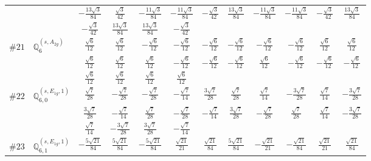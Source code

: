 \documentclass[fleqn,9pt,landscape]{jsarticle}
\begin{document}
\begin{center}
\begin{longtable}{lcccccccccc}
& $ - \frac{13 \sqrt{3}}{84} $ & $ \frac{\sqrt{3}}{42} $ & $ - \frac{11 \sqrt{3}}{84} $ & $ - \frac{11 \sqrt{3}}{84} $ & $ - \frac{\sqrt{3}}{42} $ & $ \frac{13 \sqrt{3}}{84} $ & $ - \frac{11 \sqrt{3}}{84} $ & $ - \frac{11 \sqrt{3}}{84} $ & $ - \frac{\sqrt{3}}{42} $ & $ \frac{13 \sqrt{3}}{84} $ \\
& $ - \frac{\sqrt{3}}{42} $ & $ \frac{13 \sqrt{3}}{84} $ & $ \frac{13 \sqrt{3}}{84} $ & $ - \frac{\sqrt{3}}{42} $ & $  $ & $  $ & $  $ & $  $ & $  $ & $  $ \\ \hline
$ \#21\quad \mathbb{Q}_{6}^{(s,A_{2g})} $ & $ \frac{\sqrt{6}}{12} $ & $ \frac{\sqrt{6}}{12} $ & $ - \frac{\sqrt{6}}{12} $ & $ - \frac{\sqrt{6}}{12} $ & $ - \frac{\sqrt{6}}{12} $ & $ - \frac{\sqrt{6}}{12} $ & $ - \frac{\sqrt{6}}{12} $ & $ - \frac{\sqrt{6}}{12} $ & $ \frac{\sqrt{6}}{12} $ & $ \frac{\sqrt{6}}{12} $ \\
& $ \frac{\sqrt{6}}{12} $ & $ \frac{\sqrt{6}}{12} $ & $ \frac{\sqrt{6}}{12} $ & $ - \frac{\sqrt{6}}{12} $ & $ - \frac{\sqrt{6}}{12} $ & $ - \frac{\sqrt{6}}{12} $ & $ \frac{\sqrt{6}}{12} $ & $ - \frac{\sqrt{6}}{12} $ & $ - \frac{\sqrt{6}}{12} $ & $ - \frac{\sqrt{6}}{12} $ \\
& $ \frac{\sqrt{6}}{12} $ & $ \frac{\sqrt{6}}{12} $ & $ \frac{\sqrt{6}}{12} $ & $ \frac{\sqrt{6}}{12} $ & $  $ & $  $ & $  $ & $  $ & $  $ & $  $ \\ \hline
$ \#22\quad \mathbb{Q}_{6,0}^{(s,E_{1g},1)} $ & $ \frac{\sqrt{7}}{28} $ & $ - \frac{\sqrt{7}}{28} $ & $ - \frac{\sqrt{7}}{28} $ & $ - \frac{\sqrt{7}}{14} $ & $ \frac{3 \sqrt{7}}{28} $ & $ \frac{\sqrt{7}}{28} $ & $ \frac{\sqrt{7}}{14} $ & $ - \frac{3 \sqrt{7}}{28} $ & $ \frac{\sqrt{7}}{14} $ & $ - \frac{3 \sqrt{7}}{28} $ \\
& $ \frac{3 \sqrt{7}}{28} $ & $ - \frac{\sqrt{7}}{14} $ & $ \frac{\sqrt{7}}{28} $ & $ - \frac{\sqrt{7}}{28} $ & $ - \frac{\sqrt{7}}{14} $ & $ \frac{3 \sqrt{7}}{28} $ & $ - \frac{\sqrt{7}}{28} $ & $ \frac{\sqrt{7}}{28} $ & $ \frac{\sqrt{7}}{14} $ & $ - \frac{3 \sqrt{7}}{28} $ \\
& $ \frac{\sqrt{7}}{14} $ & $ - \frac{3 \sqrt{7}}{28} $ & $ \frac{3 \sqrt{7}}{28} $ & $ - \frac{\sqrt{7}}{14} $ & $  $ & $  $ & $  $ & $  $ & $  $ & $  $ \\ \hline
$ \#23\quad \mathbb{Q}_{6,1}^{(s,E_{1g},1)} $ & $ - \frac{5 \sqrt{21}}{84} $ & $ \frac{5 \sqrt{21}}{84} $ & $ - \frac{5 \sqrt{21}}{84} $ & $ \frac{\sqrt{21}}{21} $ & $ \frac{\sqrt{21}}{84} $ & $ \frac{5 \sqrt{21}}{84} $ & $ - \frac{\sqrt{21}}{21} $ & $ - \frac{\sqrt{21}}{84} $ & $ \frac{\sqrt{21}}{21} $ & $ \frac{\sqrt{21}}{84} $ \\

\end{longtable}
\end{center}
\end{document}
